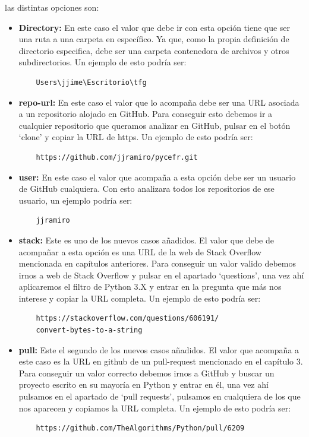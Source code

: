 \documentclass[a4paper, 12pt]{book}
\begin{document}
las distintas opciones son:

\begin{itemize}
	\item \textbf{Directory:} En este caso el valor que debe ir con esta opción tiene que ser una ruta a una carpeta en específico. Ya que, como la propia definición de directorio especifica, debe ser una carpeta contenedora de archivos y otros subdirectorios. Un ejemplo de esto podría ser:
	\begin{verbatim}
	Users\jjime\Escritorio\tfg
	\end{verbatim}
	\item \textbf{repo-url:} En este caso el valor que lo acompaña debe ser una URL asociada a un repositorio alojado en GitHub. Para conseguir esto debemos ir a cualquier repositorio que queramos analizar en GitHub, pulsar en el botón `clone' y copiar la URL de https. Un ejemplo de esto podría ser:
	\begin{verbatim}
	https://github.com/jjramiro/pycefr.git
	\end{verbatim}
	\item \textbf{user:} En este caso el valor que acompaña a esta opción debe ser un usuario de GitHub cualquiera. Con esto analizara todos los repositorios de ese usuario, un ejemplo podría ser:
	\begin{verbatim}
	jjramiro
	\end{verbatim}
	\item \textbf{stack:} Este es uno de los nuevos casos añadidos. El valor que debe de acompañar a esta opción es una URL de la web de Stack Overflow mencionada en capítulos anteriores. Para conseguir un valor valido debemos irnos a web de Stack Overflow y pulsar en el apartado `questions', una vez ahí aplicaremos el filtro de Python 3.X y entrar en la pregunta que más nos interese y copiar la URL completa. Un ejemplo de esto podría ser:
	\begin{verbatim}
	https://stackoverflow.com/questions/606191/
	convert-bytes-to-a-string
	\end{verbatim}
	\item \textbf{pull:} Este el segundo de los nuevos  casos añadidos. El valor que acompaña a este caso es la URL en github de un pull-request mencionado en el capítulo 3. Para conseguir un valor correcto debemos irnos a GitHub y buscar un proyecto escrito en su mayoría en Python y entrar en él, una vez ahí pulsamos en el apartado de `pull requests', pulsamos en cualquiera de los que nos aparecen y copiamos la URL completa. Un ejemplo de esto podría ser:
	\begin{verbatim}
	https://github.com/TheAlgorithms/Python/pull/6209
	\end{verbatim}
\end{itemize}
\end{document}
